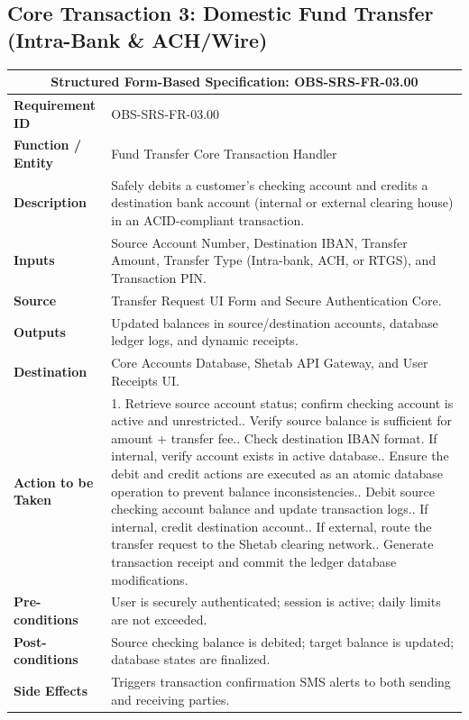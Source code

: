 \documentclass[11pt,a4paper]{article}
\begin{document}
\newpage

\subsection{Core Transaction 3: Domestic Fund Transfer (Intra-Bank \& ACH/Wire)}
\begin{center}
\small
\singlespacing
\begin{tabular}{p{4.0cm} p{11.0cm}}
\toprule
\multicolumn{2}{c}{\textbf{Structured Form-Based Specification: OBS-SRS-FR-03.00}} \\ \midrule
\textbf{Requirement ID} & OBS-SRS-FR-03.00 \\ \midrule
\textbf{Function / Entity} & Fund Transfer Core Transaction Handler \\ \midrule
\textbf{Description} & Safely debits a customer's checking account and credits a destination bank account (internal or external clearing house) in an ACID-compliant transaction. \\ \midrule
\textbf{Inputs} & Source Account Number, Destination IBAN, Transfer Amount, Transfer Type (Intra-bank, ACH, or RTGS), and Transaction PIN. \\ \midrule
\textbf{Source} & Transfer Request UI Form and Secure Authentication Core. \\ \midrule
\textbf{Outputs} & Updated balances in source/destination accounts, database ledger logs, and dynamic receipts. \\ \midrule
\textbf{Destination} & Core Accounts Database, Shetab API Gateway, and User Receipts UI. \\ \midrule
\textbf{Action to be Taken} & 
1. Retrieve source account status; confirm checking account is active and unrestricted.\newline
2. Verify source balance is sufficient for amount + transfer fee.\newline
3. Check destination IBAN format. If internal, verify account exists in active database.\newline
4. Ensure the debit and credit actions are executed as an atomic database operation to prevent balance inconsistencies.\newline
5. Debit source checking account balance and update transaction logs.\newline
6. If internal, credit destination account.\newline
7. If external, route the transfer request to the Shetab clearing network.\newline
8. Generate transaction receipt and commit the ledger database modifications. \\ \midrule
\textbf{Pre-conditions} & User is securely authenticated; session is active; daily limits are not exceeded. \\ \midrule
\textbf{Post-conditions} & Source checking balance is debited; target balance is updated; database states are finalized. \\ \midrule
\textbf{Side Effects} & Triggers transaction confirmation SMS alerts to both sending and receiving parties. \\ \bottomrule
\end{tabular}
\end{center}
\end{document}

